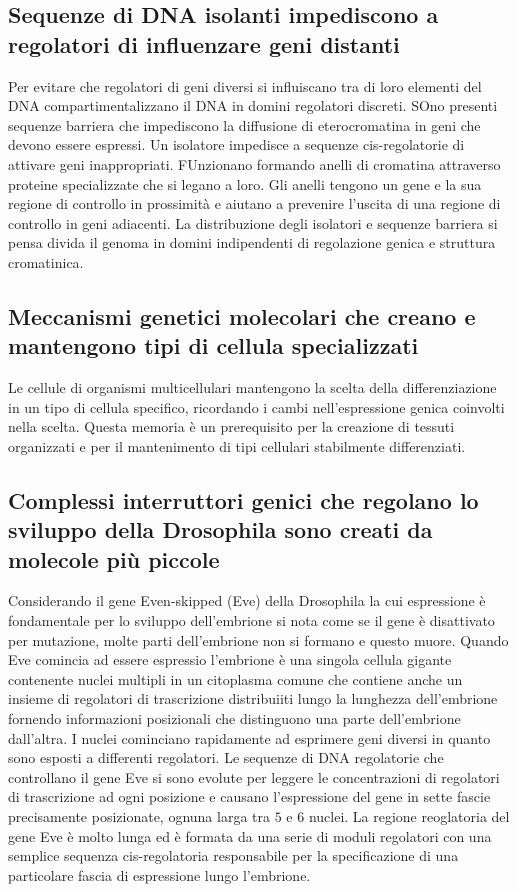 \subsection{Sequenze di DNA isolanti impediscono a regolatori di influenzare geni distanti}
Per evitare che regolatori di geni diversi si influiscano tra di loro elementi del DNA compartimentalizzano il DNA in domini regolatori discreti. SOno presenti sequenze barriera che
impediscono la diffusione di eterocromatina in geni che devono essere espressi. Un isolatore impedisce a sequenze cis-regolatorie di attivare geni inappropriati. FUnzionano formando 
anelli di cromatina attraverso proteine specializzate che si legano a loro. Gli anelli tengono un gene e la sua regione di controllo in prossimit\`a e aiutano a prevenire l'uscita di 
una regione di controllo in geni adiacenti. La distribuzione degli isolatori e sequenze barriera si pensa divida il genoma in domini indipendenti di regolazione genica e struttura 
cromatinica. 
\subsection{Meccanismi genetici molecolari che creano e mantengono tipi di cellula specializzati}
Le cellule di organismi multicellulari mantengono la scelta della differenziazione in un tipo di cellula specifico, ricordando i cambi nell'espressione genica coinvolti nella scelta.
Questa memoria \`e un prerequisito per la creazione di tessuti organizzati e per il mantenimento di tipi cellulari stabilmente differenziati. 
\subsection{Complessi interruttori genici che regolano lo sviluppo della Drosophila sono creati da molecole pi\`u piccole}
Considerando il gene Even-skipped (Eve) della Drosophila la cui espressione \`e fondamentale per lo sviluppo dell'embrione si nota come se il gene \`e disattivato per mutazione, molte
parti dell'embrione non si formano e questo muore. Quando Eve comincia ad essere espressio l'embrione \`e una singola cellula gigante contenente nuclei multipli in un citoplasma comune 
che contiene anche un insieme di regolatori di trascrizione distribuiiti lungo la lunghezza dell'embrione fornendo informazioni posizionali che distinguono una parte dell'embrione 
dall'altra. I nuclei cominciano rapidamente ad esprimere geni diversi in quanto sono esposti a differenti regolatori. Le sequenze di DNA regolatorie che controllano il gene Eve si 
sono evolute per leggere le concentrazioni di regolatori di trascrizione ad ogni posizione e causano l'espressione del gene in sette fascie precisamente posizionate, ognuna larga tra
$5$ e $6$ nuclei. La regione reoglatoria del gene Eve \`e molto lunga ed \`e formata da una serie di moduli regolatori con una semplice sequenza cis-regolatoria responsabile per la
specificazione di una particolare fascia di espressione lungo l'embrione.
